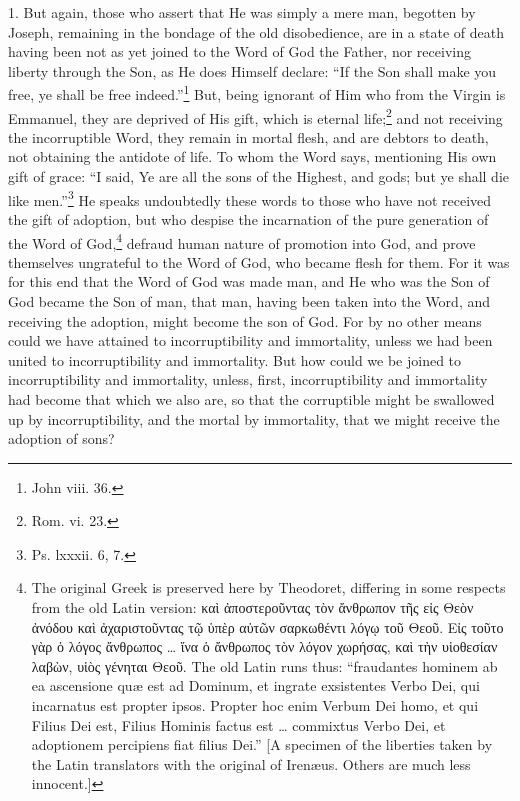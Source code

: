 
1. But again, those who assert that He was simply a mere man, begotten by Joseph, remaining in the bondage of the old disobedience, are in a state of death having been not as yet joined to the Word of God the Father, nor receiving liberty through the Son, as He does Himself declare: “If the Son shall make you free, ye shall be free indeed.”\footnote{John viii. 36.} But, being ignorant of Him who from the Virgin is Emmanuel, they are deprived of His gift, which is eternal life;\footnote{Rom. vi. 23.} and not receiving the incorruptible Word, they remain in mortal flesh, and are debtors to death, not obtaining the antidote of life. To whom the Word says, mentioning His own gift of grace: “I said, Ye are all the sons of the Highest, and gods; but ye shall die like men.”\footnote{Ps. lxxxii. 6, 7.} He speaks undoubtedly these words to those who have not received the gift of adoption, but who despise the incarnation of the pure generation of the Word of God,\footnote{The original Greek is preserved here by Theodoret, differing in some respects from the old Latin version: \textgreek{καὶ ἀποστεροῦντας τὸν ἄνθρωπον τῆς εἰς Θεὸν ἀνόδου καὶ ἀχαριστοῦντας τῷ ὑπὲρ αὐτῶν σαρκωθέντι λόγῳ τοῦ Θεοῦ. Εἰς τοῦτο γὰρ ὁ λόγος ἄνθρωπος} … \textgreek{ἵνα ὁ ἄνθρωπος τὸν λόγον χωρήσας}, \textgreek{καὶ τὴν υἱοθεσίαν λαβὼν, υἱὸς γένηται Θεοῦ.} The old Latin runs thus: “fraudantes hominem ab ea ascensione quæ est ad Dominum, et ingrate exsistentes Verbo Dei, qui incarnatus est propter ipsos. Propter hoc enim Verbum Dei homo, et qui Filius Dei est, Filius Hominis factus est … commixtus Verbo Dei, et adoptionem percipiens fiat filius Dei.” [A specimen of the liberties taken by the Latin translators with the original of Irenæus. Others are much less innocent.]} defraud human nature of promotion into God, and prove themselves ungrateful to the Word of God, who became flesh for them. For it was for this end that the Word of God was made man, and He who was the Son of God became the Son of man, that man, having been taken into the Word, and receiving the adoption, might become the son of God. For by no other means could we have attained to incorruptibility and immortality, unless we had been united to incorruptibility and immortality. But how could we be joined to incorruptibility and immortality, unless, first, incorruptibility and immortality had  become that which we also are, so that the corruptible might be swallowed up by incorruptibility, and the mortal by immortality, that we might receive the adoption of sons?

